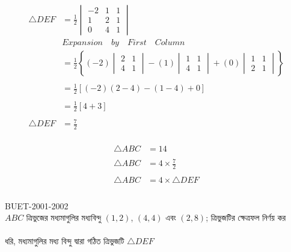 \documentclass{article}
\begin{document}
\\
	\begin{align*}
	\triangle DEF &=\frac{1}{2}\begin{vmatrix}
		-2 & 1 & 1\\
		1 & 2 & 1\\
		0 & 4 & 1
	\end{vmatrix}\\
	&\boxed{Expansion \quad by \quad  First \quad  Column}\\ 
	&=\frac{1}{2}\left\{(-2)\begin{vmatrix}
		2 & 1\\
		4 & 1
	\end{vmatrix}-(1)\begin{vmatrix}
		1 & 1\\
		4 & 1
	\end{vmatrix}+(0)\begin{vmatrix}
		1 & 1\\
		2 & 1
	\end{vmatrix}\right\}\\
	\\
	&=\frac{1}{2}\left[(-2)(2-4)-(1-4)+0\right]\\
	\\
	&=\frac{1}{2}\left[4+3\right]\\
	\\
	\triangle DEF	&=\frac{7}{2}
\end{align*}
\\
\begin{align*}
	\triangle ABC &=14\\
	\\
\triangle ABC &=4\times \frac{7}{2}\\
	\\
\triangle ABC &=4\times \triangle DEF\\
\end{align*}
\\
	BUET-2001-2002\\
	$ABC$ ত্রিভুজের মধ্যমাগুলির মধ্যবিন্দু  $(1,2)$, $(4,4)$ এবং $(2,8)$; ত্রিভুজটির ক্ষেত্রফল নির্ণয় কর \\
	\\
	ধরি, মধ্যমাগুলির  মধ্য বিন্দু দ্বারা গঠিত ত্রিভুজটি $\triangle DEF$\\
	\\ 
\end{document}
